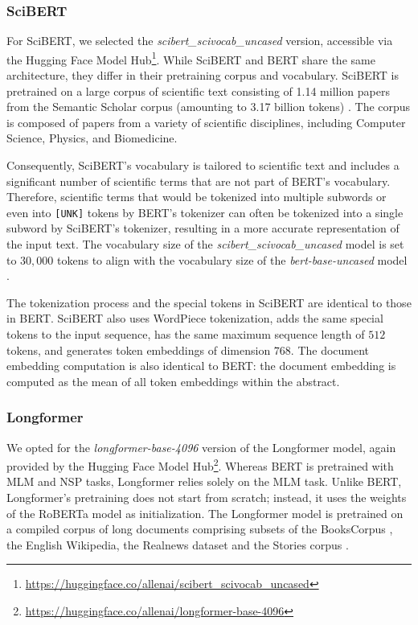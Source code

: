 \subsubsection*{SciBERT}

For SciBERT, we selected the \emph{scibert\_scivocab\_uncased} version, accessible via the Hugging Face Model Hub\footnote{\url{https://huggingface.co/allenai/scibert\_scivocab\_uncased}}.
While SciBERT and BERT share the same architecture, they differ in their pretraining corpus and vocabulary.
SciBERT is pretrained on a large corpus of scientific text consisting of 1.14 million papers from the Semantic Scholar corpus (amounting to 3.17 billion tokens) \cite{BeltagySciBERTPretrained2019}. The corpus is composed of papers from a variety of scientific disciplines, including Computer Science, Physics, and Biomedicine.

Consequently, SciBERT's vocabulary is tailored to scientific text and includes a significant number of scientific terms that are not part of BERT's vocabulary. Therefore, scientific terms that would be tokenized into multiple subwords or even into \texttt{[UNK]} tokens by BERT's tokenizer can often be tokenized into a single subword by SciBERT's tokenizer, resulting in a more accurate representation of the input text. The vocabulary size of the \emph{scibert\_scivocab\_uncased} model is set to $30,000$ tokens to align with the vocabulary size of the \emph{bert-base-uncased} model \cite{BeltagySciBERTPretrained2019}.

The tokenization process and the special tokens in SciBERT are identical to those in BERT. SciBERT also uses WordPiece tokenization, adds the same special tokens to the input sequence, has the same maximum sequence length of $512$ tokens, and generates token embeddings of dimension $768$. The document embedding computation is also identical to BERT: the document embedding is computed as the mean of all token embeddings within the abstract.


\subsubsection*{Longformer}

We opted for the \emph{longformer-base-4096} version of the Longformer model, again provided by the Hugging Face Model Hub\footnote{\url{https://huggingface.co/allenai/longformer-base-4096}}.
Whereas BERT is pretrained with \ac{MLM} and \ac{NSP} tasks, Longformer relies solely on the \ac{MLM} task.
Unlike BERT, Longformer's pretraining does not start from scratch; instead, it uses the weights of the RoBERTa model \cite{LiuRoBERTaRobustly2019} as initialization.
The Longformer model is pretrained on a compiled corpus of long documents comprising subsets of the BooksCorpus \cite{ZhuAligningBooks2015}, the English Wikipedia, the Realnews dataset \cite{ZellersDefendingNeural2019} and the Stories corpus \cite{TrinhSimpleMethod2019}.


